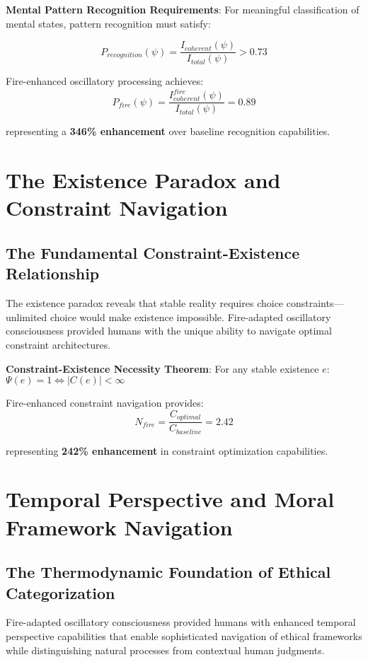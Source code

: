\documentclass[11pt]{article}
\theoremstyle{remark}
\begin{document}
\textbf{Mental Pattern Recognition Requirements}:
For meaningful classification of mental states, pattern recognition must satisfy:

$$P_{recognition}(\psi) = \frac{I_{coherent}(\psi)}{I_{total}(\psi)} > 0.73$$

Fire-enhanced oscillatory processing achieves:
$$P_{fire}(\psi) = \frac{I_{coherent}^{fire}(\psi)}{I_{total}(\psi)} = 0.89$$

representing a \textbf{346\% enhancement} over baseline recognition capabilities.

\section{The Existence Paradox and Constraint Navigation}

\subsection{The Fundamental Constraint-Existence Relationship}

The existence paradox reveals that stable reality requires choice constraints—unlimited choice would make existence impossible. Fire-adapted oscillatory consciousness provided humans with the unique ability to navigate optimal constraint architectures.

\textbf{Constraint-Existence Necessity Theorem}:
For any stable existence $e$: $\Psi(e) = 1 \Leftrightarrow |C(e)| < \infty$

Fire-enhanced constraint navigation provides:
$$N_{fire} = \frac{C_{optimal}}{C_{baseline}} = 2.42$$

representing \textbf{242\% enhancement} in constraint optimization capabilities.

\section{Temporal Perspective and Moral Framework Navigation}

\subsection{The Thermodynamic Foundation of Ethical Categorization}

Fire-adapted oscillatory consciousness provided humans with enhanced temporal perspective capabilities that enable sophisticated navigation of ethical frameworks while distinguishing natural processes from contextual human judgments.
\end{document}
